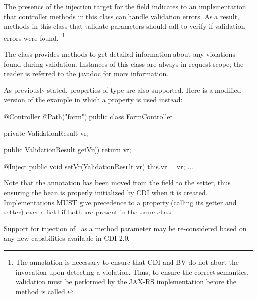 The presence of the injection target for the field 
 indicates to an implementation that controller methods in this
class can handle validation errors. As a result, methods in this class
that validate parameters should call  to verify if
validation errors were found.~\footnote{The  
annotation is necessary to ensure that CDI and BV do not abort the
invocation upon detecting a violation. Thus, to ensure the correct semantics, 
validation must be performed by the JAX-RS implementation before the method 
is called.}

The class  provides methods to get detailed information 
about any violations 
found during validation. Instances of this class are always in request
scope; the reader is referred to the javadoc for more information.

As previously stated, properties of type  
are also supported. Here is a modified version of the example in which
a property is used instead:

\begin{listing}{1}
@Controller
@Path("form")
public class FormController {

    private ValidationResult vr;
    
    public ValidationResult getVr() {
        return vr;
    }

    @Inject
    public void setVr(ValidationResult vr) {
        this.vr = vr;
    }
    ...
}
\end{listing}

Note that the  annotation has been moved from the field to the setter,
thus ensuring the bean is properly initialized by CDI when it is
created. Implementations MUST give precedence to a property (calling its getter and
setter) over a field if both are present in the same class.
 
\begin{ednote}
Support for injection of \ValRes\ as a method parameter may be re-considered based on 
any new capabilities available in CDI 2.0.
\end{ednote}
